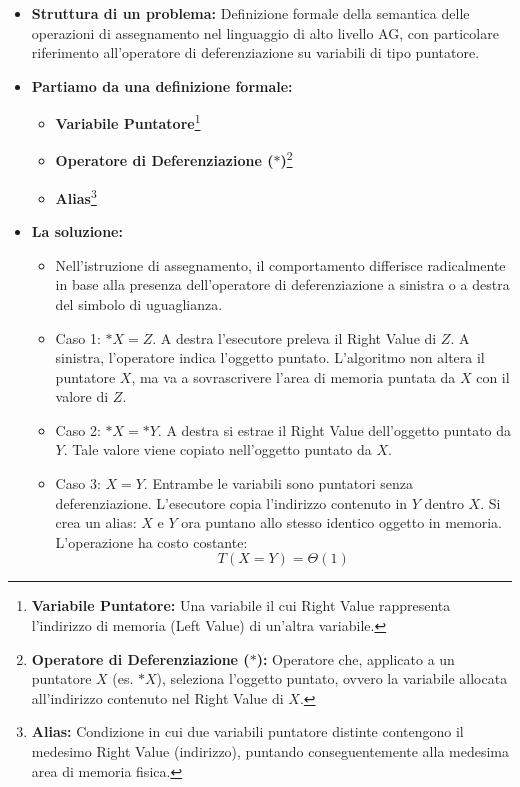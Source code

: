 \documentclass[a4paper, 11pt]{report}
\newcommand{\definizione}[2]{%
\textbf{#1}\footnote{\textbf{#1:} #2}%
}
\begin{document}
\begin{itemize}
    \item \textbf{Struttura di un problema:}
    Definizione formale della semantica delle operazioni di assegnamento nel linguaggio di alto livello AG, con particolare riferimento all'operatore di deferenziazione su variabili di tipo puntatore.

    \item \textbf{Partiamo da una definizione formale:}
    \begin{itemize}
        \item \definizione{Variabile Puntatore}{Una variabile il cui Right Value rappresenta l'indirizzo di memoria (Left Value) di un'altra variabile.}
        \item \definizione{Operatore di Deferenziazione ($*$)}{Operatore che, applicato a un puntatore $X$ (es. $*X$), seleziona l'oggetto puntato, ovvero la variabile allocata all'indirizzo contenuto nel Right Value di $X$.}
        \item \definizione{Alias}{Condizione in cui due variabili puntatore distinte contengono il medesimo Right Value (indirizzo), puntando conseguentemente alla medesima area di memoria fisica.}
    \end{itemize}

    \item \textbf{La soluzione:}
    \begin{itemize}
        \item Nell'istruzione di assegnamento, il comportamento differisce radicalmente in base alla presenza dell'operatore di deferenziazione a sinistra o a destra del simbolo di uguaglianza.
        \item Caso 1: \textbf{$*X = Z$}. A destra l'esecutore preleva il Right Value di $Z$. A sinistra, l'operatore indica l'oggetto puntato. L'algoritmo non altera il puntatore $X$, ma va a sovrascrivere l'area di memoria puntata da $X$ con il valore di $Z$.
        \item Caso 2: \textbf{$*X = *Y$}. A destra si estrae il Right Value dell'oggetto puntato da $Y$. Tale valore viene copiato nell'oggetto puntato da $X$.
        \item Caso 3: \textbf{$X = Y$}. Entrambe le variabili sono puntatori senza deferenziazione. L'esecutore copia l'indirizzo contenuto in $Y$ dentro $X$. Si crea un alias: $X$ e $Y$ ora puntano allo stesso identico oggetto in memoria. L'operazione ha costo costante:
        \[ T(X = Y) = \Theta(1) \]
    \end{itemize}
\end{itemize}
\end{document}
